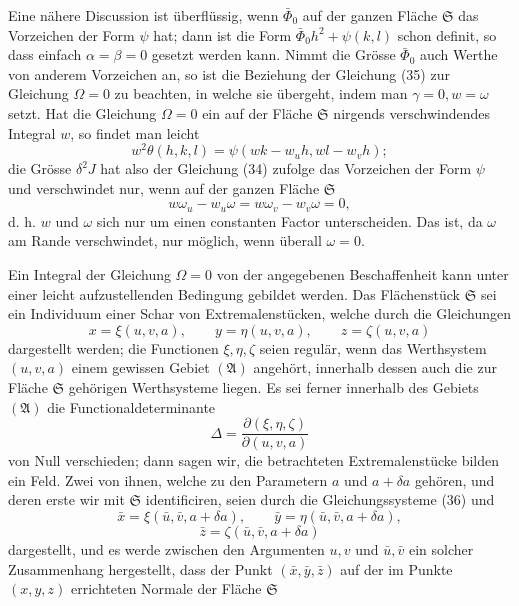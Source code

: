 \documentclass[11pt,a4paper,leqno]{article}
\begin{document}
Eine nähere Discussion ist überflüssig, wenn $\bar\Phi_0$ auf der ganzen
Fläche $\mathfrak{S}$ das Vorzeichen der Form $\psi$ hat; dann ist die Form
$\bar\Phi_0h^2+\psi(k,l)$ schon definit, so dass einfach
$\alpha=\beta=0$ gesetzt werden kann. Nimmt die Grösse $\bar\Phi_0$ auch
Werthe von anderem Vorzeichen an, so ist die Beziehung der Gleichung (35) zur
Gleichung $\Omega=0$ zu beachten, in welche sie übergeht, indem man
$\gamma=0,w=\omega$ setzt. Hat die Gleichung $\Omega=0$ ein auf der Fläche
$\mathfrak{S}$ nirgends verschwindendes Integral $w$, so findet man leicht
\[
w^2\theta(h,k,l)=\psi(wk-w_uh,wl-w_vh);
\]
die Grösse $\delta^2J$ hat also der Gleichung (34) zufolge das Vorzeichen der
Form $\psi$ und verschwindet nur, wenn auf der ganzen Fläche $\mathfrak{S}$
\[
w\omega_u-w_u\omega=w\omega_v-w_v\omega=0,
\]
d. h. $w$ und $\omega$ sich nur um einen constanten Factor unterscheiden.
Das ist, da $\omega$ am Rande verschwindet, nur möglich, wenn überall
$\omega=0$.

Ein Integral der Gleichung $\Omega=0$ von der angegebenen Beschaffenheit kann
unter einer leicht aufzustellenden Bedingung gebildet werden. Das
Flächenstück $\mathfrak{S}$ sei ein Individuum einer Schar von
Extremalenstücken, welche durch die Gleichungen
\begin{equation}\tag{36}
x=\xi(u,v,a),\qquad y=\eta(u,v,a),\qquad z=\zeta(u,v,a)
\end{equation}
dargestellt werden; die Functionen $\xi,\eta,\zeta$ seien regulär, wenn das
Werthsystem $(u,v,a)$ einem gewissen Gebiet $(\mathfrak{A})$ angehört,
innerhalb dessen auch die zur Fläche $\mathfrak{S}$ gehörigen Werthsysteme
liegen. Es sei ferner innerhalb des Gebiets $(\mathfrak{A})$ die
Functionaldeterminante
\[
\Delta=\frac{\partial(\xi,\eta,\zeta)}{\partial(u,v,a)}
\]
von Null verschieden; dann sagen wir, die betrachteten Extremalenstücke
bilden ein Feld. Zwei von ihnen, welche zu den Parametern $a$ und
$a+\delta a$ gehören, und deren erste wir mit $\mathfrak{S}$ identificiren,
seien durch die Gleichungssysteme (36) und
\[
\bar x=\xi(\bar u,\bar v,a+\delta a),\qquad
\bar y=\eta(\bar u,\bar v,a+\delta a),
\]
\[
\bar z=\zeta(\bar u,\bar v,a+\delta a)
\]
dargestellt, und es werde zwischen den Argumenten $u,v$ und $\bar u,\bar v$
ein solcher Zusammenhang hergestellt, dass der Punkt
$(\bar x,\bar y,\bar z)$ auf der im Punkte $(x,y,z)$ errichteten Normale der
Fläche $\mathfrak{S}$
\end{document}
